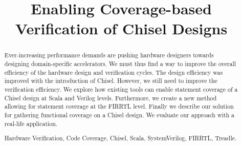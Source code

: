 \documentclass[conference]{IEEEtran}
\begin{document}
%
\title{Enabling Coverage-based Verification of Chisel Designs}
\author{
}
%
%
%

%
%
\maketitle              %
%
\begin{abstract}
Ever-increasing performance demands are pushing hardware designers towards designing domain-specific accelerators. We must thus find a way to improve the overall efficiency of the hardware design and verification cycles. The design efficiency was improved with the introduction of Chisel. However, we still need to improve the verification efficiency.
We explore how existing tools can enable statement coverage of a Chisel design at Scala and Verilog levels. Furthermore, we create a new method allowing for statement coverage at the FIRRTL level. Finally we describe our solution for gathering functional coverage on a Chisel design.
We evaluate our approach with a real-life application.

\begin{IEEEkeywords}
Hardware Verification, Code Coverage, Chisel, Scala, SystemVerilog, FIRRTL, Treadle.
\end{IEEEkeywords}

\end{abstract}
\end{document}
